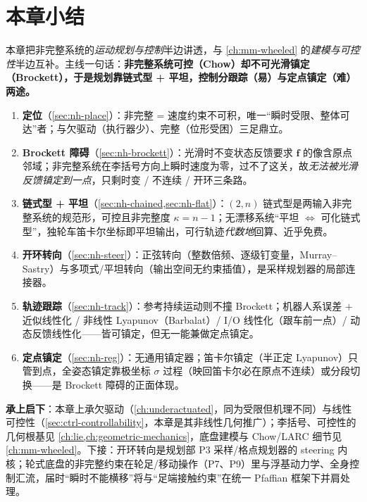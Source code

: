 \section*{本章小结}

本章把非完整系统的\emph{运动规划与控制}半边讲透，与 \cref{ch:mm-wheeled} 的\emph{建模与可控性}半边互补。主线一句话：\textbf{非完整系统可控（Chow）却不可光滑镇定（Brockett），于是规划靠链式型 + 平坦，控制分跟踪（易）与定点镇定（难）两途。}

\begin{enumerate}
  \item \textbf{定位}（\cref{sec:nh-place}）：非完整 = 速度约束不可积，唯一“瞬时受限、整体可达”者；与欠驱动（执行器少）、完整（位形受困）三足鼎立。
  \item \textbf{Brockett 障碍}（\cref{sec:nh-brockett}）：光滑时不变状态反馈要求 $\mathbf{f}$ 的像含原点邻域；非完整系统在李括号方向上瞬时速度为零，过不了这关，故\emph{无法被光滑反馈镇定到一点}，只剩时变 / 不连续 / 开环三条路。
  \item \textbf{链式型 + 平坦}（\cref{sec:nh-chained,sec:nh-flat}）：$(2,n)$ 链式型是两输入非完整系统的规范形，可控且非完整度 $\kappa=n-1$；无漂移系统“平坦 $\Leftrightarrow$ 可化链式型”，独轮车笛卡尔坐标即平坦输出，可行轨迹\emph{代数地}回算、近乎免费。
  \item \textbf{开环转向}（\cref{sec:nh-steer}）：正弦转向（整数倍频、逐级钉变量，Murray--Sastry）与多项式/平坦转向（输出空间无约束插值），是采样规划器的局部连接器。
  \item \textbf{轨迹跟踪}（\cref{sec:nh-track}）：参考持续运动则不撞 Brockett；机器人系误差 $+$ 近似线性化 / 非线性 Lyapunov（Barbalat）/ I/O 线性化（跟车前一点）/ 动态反馈线性化——皆可镇定，但无一能兼做定点镇定。
  \item \textbf{定点镇定}（\cref{sec:nh-reg}）：无通用镇定器；笛卡尔镇定（半正定 Lyapunov）只管到点，全姿态镇定靠极坐标 $\sigma$ 过程（映回笛卡尔必在原点不连续）或分段切换——是 Brockett 障碍的正面体现。
\end{enumerate}

\noindent\textbf{承上启下}：本章上承欠驱动（\cref{ch:underactuated}，同为受限但机理不同）与线性可控性（\cref{sec:ctrl-controllability}，本章是其非线性几何推广）；李括号、可控性的几何根基见 \cref{ch:lie,ch:geometric-mechanics}，底盘建模与 Chow/LARC 细节见 \cref{ch:mm-wheeled}。下接：开环转向是规划部 P3 采样/格点规划器的 steering 内核；轮式底盘的非完整约束在轮足/移动操作（P7、P9）里与浮基动力学、全身控制汇流，届时“瞬时不能横移”将与“足端接触约束”在统一 Pfaffian 框架下并肩处理。

